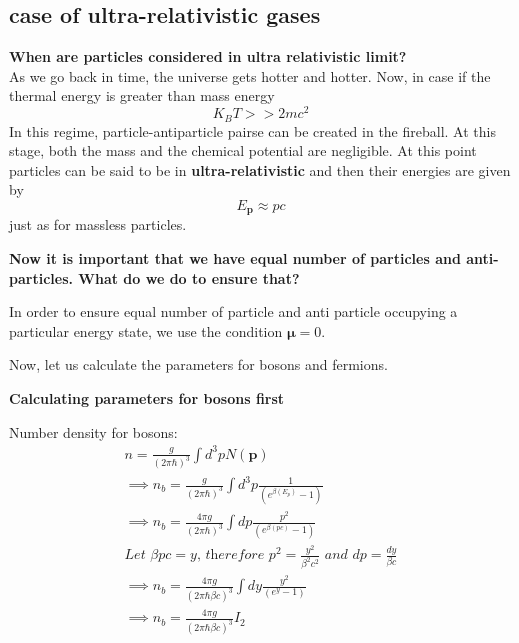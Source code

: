 \documentclass[12pt]{report}
\newcommand{\mbf}[1]{\mathbf{#1}}
\newcommand{\tbf}[1]{\textbf{#1}}
\newcommand{\tit}[1]{\textit{#1}}
\begin{document}
\subsection{case of ultra-relativistic gases}
\tbf{When are particles considered in ultra relativistic limit?}\\
As we go back in time, the universe gets hotter and hotter. Now, in case if the thermal energy is greater than mass energy
\begin{equation*}
K_BT >> 2mc^2
\end{equation*}
In this regime, particle-antiparticle pairse can be created in the fireball. At this stage, both the mass and the chemical potential are negligible. At this point particles can be said to be in \tbf{ultra-relativistic} and then their energies are given by
\begin{equation*}
E_\mbf{p} \approx pc
\end{equation*}
just as for massless particles.

\tbf{Now it is important that we have equal number of particles and anti-particles. What do we do to ensure that?}

In order to ensure equal number of particle and anti particle occupying  a particular energy state, we use the condition $\mbf{\mu}=0$.

Now, let us calculate the parameters for bosons and fermions.

\tbf{Calculating parameters for bosons first}

Number density for bosons:
\begin{eqnarray*}
n= \frac{g }{(2 \pi \hbar)^3} \int d^3p N(\mbf{p})\\
\implies n_{b}= \frac{g }{(2 \pi \hbar)^3} \int d^3p \frac{    1}{(e^{\beta(E_p)} - 1)}\\
\implies n_{b}= \frac{ 4 \pi g}{(2 \pi \hbar)^3} \int dp \frac{    p^2}{(e^{\beta(pc)} - 1)}\\
\tit{Let $\beta pc = y$, therefore $p^2=\frac{y^2}{\beta^2 c^2}$ and $dp=\frac{dy}{\beta c}$}\\
\implies n_{b}= \frac{ 4 \pi g}{(2 \pi \hbar \beta c)^3 } \int dy \frac{    y^2}{(e^{y} - 1)}\\
\implies n_{b}= \frac{ 4 \pi g}{(2 \pi \hbar \beta c)^3 } I_2\\
\end{eqnarray*}
\end{document}
